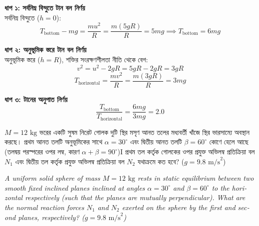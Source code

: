 \documentclass[12pt, a4paper]{article}
\begin{document}
{{%
\begin{tcolorbox}[solutionbox={সমাধান (Solution)}]
\noindent
\textbf{ধাপ ১: সর্বনিম্ন বিন্দুতে টান বল নির্ণয়} \\
সর্বনিম্ন বিন্দুতে ($h = 0$):
\[T_{\text{bottom}} - mg = \frac{m u^2}{R} = \frac{m(5gR)}{R} = 5mg \implies T_{\text{bottom}} = 6mg\]

\vspace{0.5em}
\noindent\textbf{ধাপ ২: অনুভূমিক স্তরে টান বল নির্ণয়} \\
অনুভূমিক স্তরে ($h = R$), শক্তির সংরক্ষণশীলতা নীতি থেকে বেগ:
\[v^2 = u^2 - 2gR = 5gR - 2gR = 3gR\]
\[T_{\text{horizontal}} = \frac{m v^2}{R} = \frac{m(3gR)}{R} = 3mg\]

\vspace{0.5em}
\noindent\textbf{ধাপ ৩: টানের অনুপাত নির্ণয়} \\
\[\frac{T_{\text{bottom}}}{T_{\text{horizontal}}} = \frac{6mg}{3mg} = \mathbf{2.0}\]
\end{tcolorbox}
\begin{tcolorbox}[questionbox={প্রশ্ন (Question) 27}]
    \noindent
    $M = 12\text{ kg}$ ভরের একটি সুষম নিরেট গোলক দুটি স্থির মসৃণ আনত তলের মধ্যবর্তী খাঁজে স্থির ভারসাম্যে অবস্থান করছে। প্রথম আনত তলটি অনুভূমিকের সাথে $\alpha = 30^\circ$ এবং দ্বিতীয় আনত তলটি $\beta = 60^\circ$ কোণে হেলে আছে (তলদ্বয় পরস্পরের ওপর লম্ব, কারণ $\alpha + \beta = 90^\circ$)I প্রথম তল কর্তৃক গোলকের ওপর প্রযুক্ত অভিলম্ব প্রতিক্রিয়া বল $N_1$ এবং দ্বিতীয় তল কর্তৃক প্রযুক্ত অভিলম্ব প্রতিক্রিয়া বল $N_2$ যথাক্রমে কত হবে? ($g = 9.8\text{ m/s}^2$)
    
    \vspace{0.8em}
    \begin{english}
    \noindent\textit{\color{darkgray}
    A uniform solid sphere of mass $M = 12\text{ kg}$ rests in static equilibrium between two smooth fixed inclined planes inclined at angles $\alpha = 30^\circ$ and $\beta = 60^\circ$ to the horizontal respectively (such that the planes are mutually perpendicular). What are the normal reaction forces $N_1$ and $N_2$ exerted on the sphere by the first and second planes, respectively? ($g = 9.8\text{ m/s}^2$)
    }
    \end{english}
\end{tcolorbox}

\vspace{1em}
\begin{center}
\end{center}}}
\end{document}
